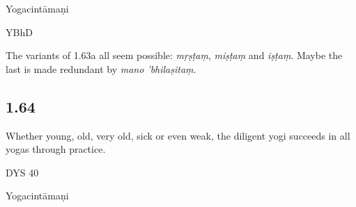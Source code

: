 \begin{ekdosis}
\begin{testimonia}[hp01_063]
Yogacintāmaṇi

\begin{versinnote}
\end{versinnote}

YBhD

\begin{versinnote}
\end{versinnote}

\end{testimonia}

\begin{philcomm}[hp01_063]
The variants of 1.63a all seem possible: \emph{mṛṣṭaṃ}, \emph{miṣṭaṃ} and \emph{iṣṭaṃ}. Maybe the last is made redundant by \emph{mano 'bhilaṣitaṃ}.
\end{philcomm}

\subsection*{1.64}
\begin{translation}[hp01_064]
Whether young, old, very old, sick or even weak, the diligent yogi succeeds in all yogas through practice.
\end{translation}

\begin{sources}[hp01_064]
DYS 40

\begin{versinnote}
\end{versinnote}

\end{sources}

\begin{testimonia}[hp01_064]
Yogacintāmaṇi

\begin{versinnote}
\end{versinnote}


\end{testimonia}
\end{ekdosis}
